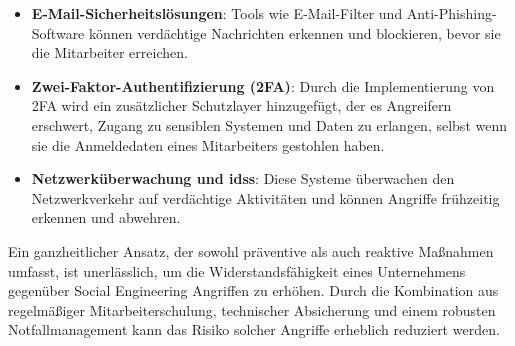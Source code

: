 \begin{itemize}
    \item \textbf{E-Mail-Sicherheitslösungen}: Tools wie E-Mail-Filter und Anti-Phishing-Software können verdächtige Nachrichten erkennen und blockieren, bevor sie die Mitarbeiter erreichen.
    \item \textbf{Zwei-Faktor-Authentifizierung (2FA)}: Durch die Implementierung von 2FA wird ein zusätzlicher Schutzlayer hinzugefügt, der es Angreifern erschwert, Zugang zu sensiblen Systemen und Daten zu erlangen, selbst wenn sie die Anmeldedaten eines Mitarbeiters gestohlen haben.
    \item \textbf{Netzwerküberwachung und \glspl{ids}}: Diese Systeme überwachen den Netzwerkverkehr auf verdächtige Aktivitäten und können Angriffe frühzeitig erkennen und abwehren.
\end{itemize}

Ein ganzheitlicher Ansatz, der sowohl präventive als auch reaktive Maßnahmen umfasst, ist unerlässlich, um die Widerstandsfähigkeit eines Unternehmens gegenüber Social Engineering Angriffen zu erhöhen.
Durch die Kombination aus regelmäßiger Mitarbeiterschulung, technischer Absicherung und einem robusten Notfallmanagement kann das Risiko solcher Angriffe erheblich reduziert werden.\cite{social-engineering-a-survey, bsi-social-engineering}


